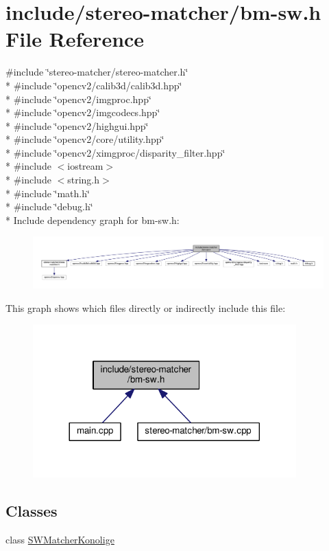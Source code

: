 \hypertarget{bm-sw_8h}{}\section{include/stereo-\/matcher/bm-\/sw.h File Reference}
\label{bm-sw_8h}
{\ttfamily \#include \char`\"{}stereo-\/matcher/stereo-\/matcher.\+h\char`\"{}}\\*
{\ttfamily \#include \char`\"{}opencv2/calib3d/calib3d.\+hpp\char`\"{}}\\*
{\ttfamily \#include \char`\"{}opencv2/imgproc.\+hpp\char`\"{}}\\*
{\ttfamily \#include \char`\"{}opencv2/imgcodecs.\+hpp\char`\"{}}\\*
{\ttfamily \#include \char`\"{}opencv2/highgui.\+hpp\char`\"{}}\\*
{\ttfamily \#include \char`\"{}opencv2/core/utility.\+hpp\char`\"{}}\\*
{\ttfamily \#include \char`\"{}opencv2/ximgproc/disparity\+\_\+filter.\+hpp\char`\"{}}\\*
{\ttfamily \#include $<$iostream$>$}\\*
{\ttfamily \#include $<$string.\+h$>$}\\*
{\ttfamily \#include \char`\"{}math.\+h\char`\"{}}\\*
{\ttfamily \#include \char`\"{}debug.\+h\char`\"{}}\\*
Include dependency graph for bm-\/sw.h\+:
\nopagebreak
\begin{figure}[H]
\begin{center}
\leavevmode
\includegraphics[width=350pt]{bm-sw_8h__incl}
\end{center}
\end{figure}
This graph shows which files directly or indirectly include this file\+:
\nopagebreak
\begin{figure}[H]
\begin{center}
\leavevmode
\includegraphics[width=288pt]{bm-sw_8h__dep__incl}
\end{center}
\end{figure}
\subsection*{Classes}
\begin{DoxyCompactItemize}
\item 
class \hyperlink{classSWMatcherKonolige}{S\+W\+Matcher\+Konolige}
\end{DoxyCompactItemize}
